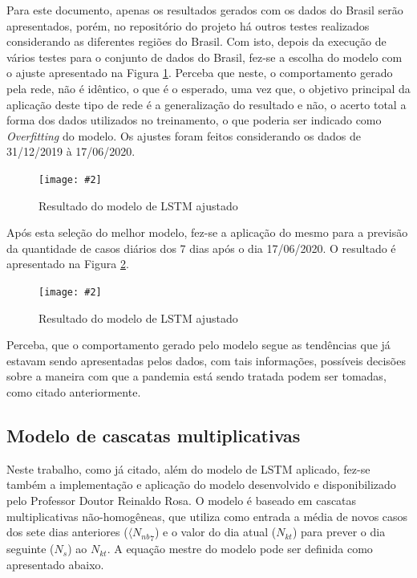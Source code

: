 \documentclass[a4paper,12pt]{article}
\newcommand{\image}[4]{
    \begin{figure}[H]%
        \begin{center}
        \caption{#3}
        \texttt{[image: \#2]}
        \label{#4}
        \end{center}
    \end{figure}
}
\begin{document}
\par Para este documento, apenas os resultados gerados com os dados do Brasil serão apresentados, porém, no repositório do projeto há outros testes realizados considerando as diferentes regiões do Brasil. Com isto, depois da execução de vários testes para o conjunto de dados do Brasil, fez-se a escolha do modelo com o ajuste apresentado na Figura \ref{figure:lstm_1}. Perceba que neste, o comportamento gerado pela rede, não é idêntico, o que é o esperado, uma vez que, o objetivo principal da aplicação deste tipo de rede é a generalização do resultado e não, o acerto total a forma dos dados utilizados no treinamento, o que poderia ser indicado como \textit{Overfitting} do modelo. Os ajustes foram feitos considerando os dados de 31/12/2019 à 17/06/2020.

\image{0.85}{images/lstm/modelo_ajustado/1_modelo_ajustado_brasil.png}{Resultado do modelo de LSTM ajustado}{figure:lstm_1}

\par Após esta seleção do melhor modelo, fez-se a aplicação do mesmo para a previsão da quantidade de casos diários dos 7 dias após o dia 17/06/2020. O resultado é apresentado na Figura \ref{figure:lstm_2}.

\image{0.85}{images/lstm/previsao_realizada/1_predicao_brasil.png}{Resultado do modelo de LSTM ajustado}{figure:lstm_2}

\par Perceba, que o comportamento gerado pelo modelo segue as tendências que já estavam sendo apresentadas pelos dados, com tais informações, possíveis decisões sobre a maneira com que a pandemia está sendo tratada podem ser tomadas, como citado anteriormente.

\subsection{Modelo de cascatas multiplicativas}

\par Neste trabalho, como já citado, além do modelo de LSTM aplicado, fez-se também a implementação e aplicação do modelo desenvolvido e disponibilizado pelo Professor Doutor Reinaldo Rosa.  O modelo é baseado em cascatas multiplicativas não-homogêneas, que utiliza como entrada a média de novos casos dos sete dias anteriores ($\langle{N_{nb}}_7$) e o valor do dia atual ($N_{kt}$) para prever o dia seguinte ($N_s$) ao $N_{kt}$. A equação mestre do modelo pode ser definida como apresentado abaixo.
\end{document}
